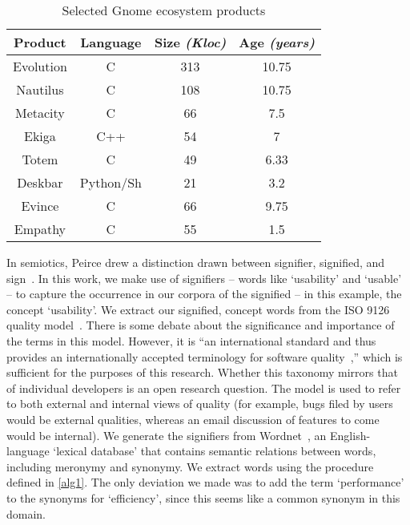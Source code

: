 \documentclass[conference, compsoc]{IEEEtran}
\begin{document}
\begin{table}
	\caption{Selected Gnome ecosystem products}
	\centering
	\label{tbl:projects}
\begin{tabular}{|c|c|c|c|}
\hline
\rowcolor[gray]{.9} 
\textbf{Product} & \textbf{Language} & \textbf{Size} \emph{(Kloc)} & \textbf{Age} \emph{(years)} \\
\hline
\hline 
Evolution & C & 313 & 10.75\\ \hline
Nautilus & C & 108 & 10.75  \\ \hline
Metacity & C & 66 & 7.5  \\ \hline
Ekiga & C++ & 54 & 7  \\ \hline
Totem & C & 49 & 6.33  \\ \hline
Deskbar & Python/Sh & 21 & 3.2  \\ \hline
Evince & C & 66 & 9.75\\ \hline
Empathy &C & 55 & 1.5\\ 
\hline
\end{tabular}
\end{table}

In semiotics, Peirce drew a distinction drawn between signifier, signified, and sign~\cite{atkin2006}. In this work, we make use of signifiers -- words like `usability' and `usable' -- to capture the occurrence in our corpora of the signified -- in this example, the concept `usability'. We extract our signified, concept words from the ISO 9126 quality model~\cite{iso9126}. There is some debate about the significance and importance of the terms in this model. However, it is ``an international standard and thus provides an internationally accepted terminology for software quality~\cite[p. 58]{Boegh2008},'' which is sufficient for the purposes of this research. Whether this taxonomy mirrors that of individual developers is an open research question. The model is used to refer to both external and internal views of quality (for example, bugs filed by users would be external qualities, whereas an email discussion of features to come would be internal). We generate the signifiers from Wordnet~\cite{Fellbaum1998}, an English-language `lexical database' that contains semantic relations between words, including meronymy and synonymy. We extract words using the procedure defined in \ref{alg1}. The only deviation we made was to add the term `performance' to the synonyms for `efficiency', since this seems like a common synonym in this domain.%
\end{document}

